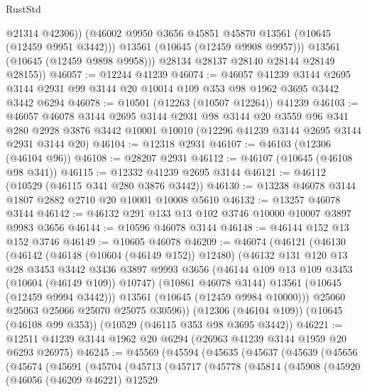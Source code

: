 \begin{lexlean}{RustStd}
\begin{coremodule}
                @21314
                @42306))
            (@46002 @9950 @3656 @45851 @45870 @13561 (@10645 (@12459 @9951 @3442)))
            @13561
            (@10645 (@12459 @9908 @9957)))
          @13561
          (@10645 (@12459 @9898 @9958)))
        @28134
        @28137
        @28140
        @28144
        @28149
        @28155))
@46057 := @12244 @41239
@46074 := @46057
    @41239
    @3144
    @2695
    @3144
    @2931
    @99
    @3144
    @20
    @10014
    @109
    @353
    @98
    @1962
    @3695
    @3442
    @3442
    @6294
@46078 := @10501 (@12263 (@10507 @12264)) @41239
@46103 := @46057
    @46078
    @3144
    @2695
    @3144
    @2931
    @98
    @3144
    @20
    @3559
    @96
    @341
    @280
    @2928
    @3876
    @3442
    @10001
    @10010
    (@12296 @41239 @3144 @2695 @3144 @2931 @3144 @20)
@46104 := @12318 @2931
@46107 := @46103 (@12306 (@46104 @96))
@46108 := @28207 @2931
@46112 := @46107 (@10645 (@46108 @98 @341))
@46115 := @12332 @41239 @2695 @3144
@46121 := @46112 (@10529 (@46115 @341 @280 @3876 @3442))
@46130 := @13238 @46078 @3144 @1807 @2882 @2710 @20 @10001 @10008 @5610
@46132 := @13257 @46078 @3144
@46142 := @46132 @291 @133 @13 @102 @3746 @10000 @10007 @3897 @9983 @3656
@46144 := @10596 @46078 @3144
@46148 := @46144 @152 @13 @152 @3746
@46149 := @10605 @46078
@46209 := @46074
    (@46121
      (@46130
        (@46142
          (@46148 (@10604 (@46149 @152)) @12480)
          (@46132
            @131
            @120
            @13
            @28
            @3453
            @3442
            @3436
            @3897
            @9993
            @3656
            (@46144 @109 @13 @109 @3453 (@10604 (@46149 @109)) @10747)
            (@10861 @46078 @3144)
            @13561
            (@10645 (@12459 @9994 @3442)))
          @13561
          (@10645 (@12459 @9984 @10000)))
        @25060
        @25063
        @25066
        @25070
        @25075
        @30596))
    (@12306 (@46104 @109))
    (@10645 (@46108 @99 @353))
    (@10529 (@46115 @353 @98 @3695 @3442))
@46221 := @12511 @41239 @3144 @1962 @20 @6294 (@26963 @41239 @3144 @1959 @20 @6293 @26975)
@46245 := @45569
    (@45594
      (@45635
        (@45637
          (@45639
            (@45656
              (@45674
                (@45691
                  (@45704
                    (@45713
                      (@45717
                        (@45778
                          (@45814
                            (@45908
                              (@45920
                                (@46056
                                  (@46209 @46221)
                                  @12529

\end{coremodule}
\end{lexlean}
